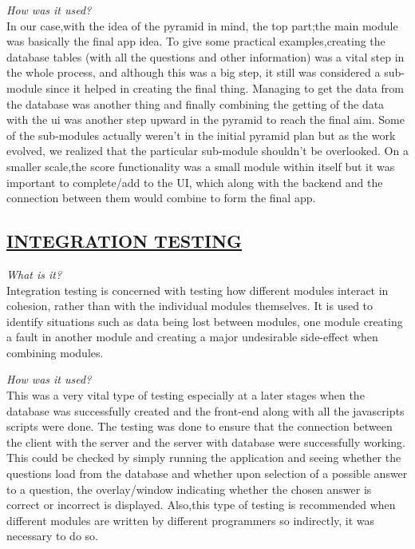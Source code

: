 \documentclass[paper=a4,fontsize=11pt]{article}
\newcommand{\sepspace}{\vspace*{1em}}		%
\newcommand{\sephalfspace}{\vspace*{0.3em}}		%
\newcommand{\SectionPart}[1]{\subsection*{\uppercase{#1}}}
\begin{document}
\noindent
\textit{How was it used?}\\
In our case,with the idea of the pyramid in mind, the top part;the main module was basically the final app idea.
To give some practical examples,creating the database tables (with all the questions and other information) was
a vital step in the whole process, and although this was a big step, it still was considered a sub-module since
it helped in creating the final thing. Managing to get the data from the database was another thing and finally
combining the getting of the data with the ui was another step upward in the pyramid to reach the final aim.
Some of the sub-modules actually weren't in the initial pyramid plan but as the work evolved, we realized that
the particular sub-module shouldn't be overlooked. On a smaller scale,the score functionality was a small
module within itself but it was important to complete/add to the UI, which along with the backend and the
connection between them would combine to form the final app.\\
\sepspace

\SectionPart{\ul{Integration Testing}}
\textit{What is it?}\\
Integration testing is concerned with testing how different modules interact in cohesion, rather than with
the individual modules themselves. It is used to identify situations such as data being lost between modules,
one module creating a fault in another module and creating a major undesirable side-effect when combining modules.\\
\sephalfspace

\noindent
\textit{How was it used?}\\
This was a very vital type of testing especially at a later stages when the database was successfully
created and the front-end along with all the javascripts scripts were done. The testing was done to
ensure that the connection between the client with the server and the server with database were successfully
working. This could be checked by simply running the application and seeing whether the questions load from
the database and whether upon selection of a possible answer to a question, the overlay/window indicating
whether the chosen answer is correct or incorrect is displayed. Also,this type of testing is recommended when
different modules are written by different programmers so indirectly, it was necessary to do so.\\

\sepspace
\end{document}
